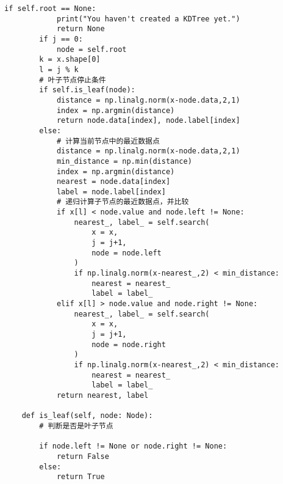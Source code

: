 \begin{lstlisting}[caption = kd-树构造算法和搜索算法实现]
        if self.root == None:
            print("You haven't created a KDTree yet.")
            return None
        if j == 0:
            node = self.root
        k = x.shape[0]
        l = j % k
        # 叶子节点停止条件
        if self.is_leaf(node):
            distance = np.linalg.norm(x-node.data,2,1)
            index = np.argmin(distance)
            return node.data[index], node.label[index]
        else:
            # 计算当前节点中的最近数据点
            distance = np.linalg.norm(x-node.data,2,1)
            min_distance = np.min(distance)
            index = np.argmin(distance)
            nearest = node.data[index]
            label = node.label[index]
            # 递归计算子节点的最近数据点，并比较
            if x[l] < node.value and node.left != None:
                nearest_, label_ = self.search(
                    x = x,
                    j = j+1,
                    node = node.left
                )
                if np.linalg.norm(x-nearest_,2) < min_distance:
                    nearest = nearest_
                    label = label_
            elif x[l] > node.value and node.right != None:
                nearest_, label_ = self.search(
                    x = x,
                    j = j+1,
                    node = node.right
                )
                if np.linalg.norm(x-nearest_,2) < min_distance:
                    nearest = nearest_
                    label = label_
            return nearest, label

    def is_leaf(self, node: Node):
        # 判断是否是叶子节点
        
        if node.left != None or node.right != None:
            return False
        else:
            return True
\end{lstlisting}